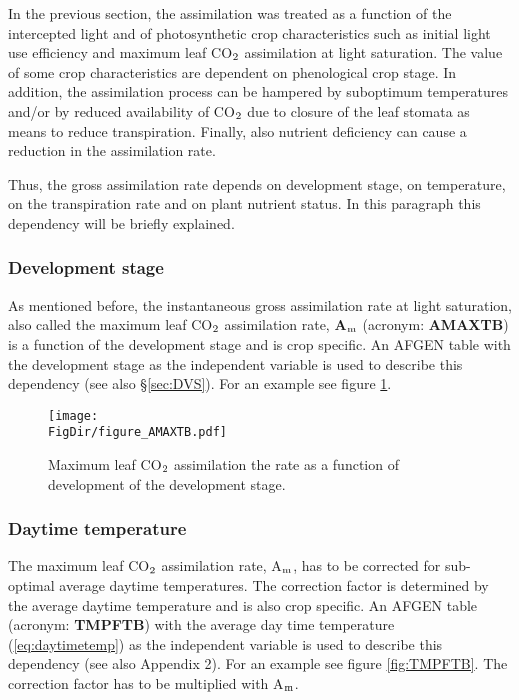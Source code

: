 In the previous section, the assimilation was treated as a function of the intercepted light and of
photosynthetic crop characteristics such as initial light use efficiency and maximum leaf
CO$_{{\rm 2}}$ assimilation at light saturation. The value of some crop characteristics are dependent
on phenological crop stage. In addition, the assimilation process can be hampered by
suboptimum temperatures and/or by reduced availability of CO$_{{\rm 2}}$ due to closure of the leaf
stomata as means to reduce transpiration. Finally, also nutrient deficiency can cause a reduction
in the assimilation rate.

Thus, the gross assimilation rate depends on development stage, on temperature, on the transpiration rate
and on plant nutrient status. In this paragraph this dependency will be briefly explained.

\subsubsection{Development stage}
As mentioned before, the instantaneous gross assimilation rate at light saturation, also
called the maximum leaf CO$_{{\rm 2}}$ assimilation rate, {\bf A$_{{\rm m}}$} (acronym: 
{\bf AMAXTB}) is a function of
the development stage and is crop specific. An AFGEN table with the development stage
as the independent variable is used to describe this dependency (see also \S \ref{sec:DVS}). For an
example see figure \ref{fig:AMAXTB}.

\begin{figure}[p]
	\centering
	\texttt{[image: \\FigDir/figure\_AMAXTB.pdf]}
	\caption{Maximum leaf CO$_{{\rm 2}}$ assimilation the rate as a function of development of
		the development stage.}
	\label{fig:AMAXTB}
\end{figure}

\subsubsection{Daytime temperature}
The maximum leaf CO$_{{\rm 2}}$ assimilation rate, A$_{{\rm m}}$, has to be corrected for sub-optimal average
daytime temperatures. The correction factor is determined by the average daytime
temperature and is also crop specific. An AFGEN table (acronym: {\bf TMPFTB}) with the
average day time temperature (\ref{eq:daytimetemp}) as the independent variable is used to describe this
dependency (see also Appendix 2). For an example see figure \ref{fig:TMPFTB}. 
The correction factor has to be multiplied with A$_{{\rm m}}$. 

